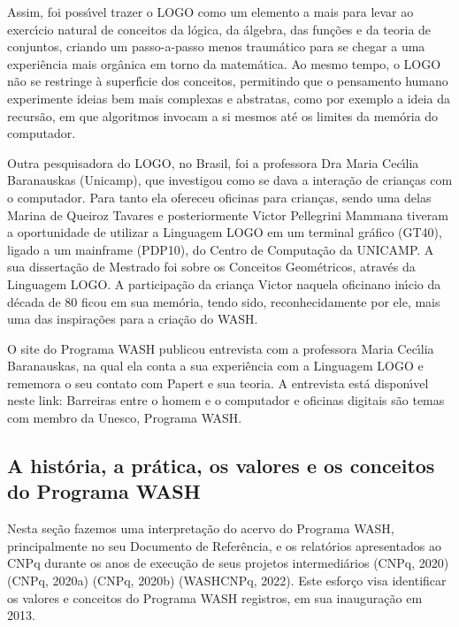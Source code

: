 \documentclass[
12pt,		%
openright,	%
twoside,  %
a4paper,			%
chapter=TITLE,		%
english,			%
french,				%
spanish,			%
brazil				%
]{USPSC-classe/USPSC}
\begin{document}
Assim, foi poss\'{\i}vel trazer o LOGO como um elemento a mais para levar ao exerc\'{\i}cio natural de conceitos da l\'ogica, da \'algebra, das fun\c{c}\~oes e da teoria de conjuntos, criando um passo-a-passo menos traum\'atico para se chegar a uma experi\^encia mais org\^anica em torno da matem\'atica. Ao mesmo tempo, o LOGO n\~ao se restringe \`a superf\'{\i}cie dos conceitos, permitindo que o pensamento humano experimente ideias bem mais complexas e abstratas, como por exemplo a ideia da recurs\~ao, em que algoritmos invocam a si mesmos at\'e os limites da mem\'oria do computador.








Outra pesquisadora do LOGO, no Brasil, foi a professora  Dra Maria Cec\'{\i}lia Baranauskas (Unicamp), que investigou como  se dava a intera\c{c}\~ao de crian\c{c}as com o computador. Para tanto ela ofereceu oficinas para  crian\c{c}as, sendo uma delas Marina de Queiroz Tavares  e posteriormente Victor Pellegrini Mammana  tiveram a oportunidade  de  utilizar a Linguagem LOGO em um terminal gr\'afico (GT40), ligado a um mainframe (PDP10), do Centro de Computa\c{c}\~ao da UNICAMP. A sua disserta\c{c}\~ao de Mestrado foi sobre os \textquotedbl Conceitos Geom\'etricos, atrav\'es da Linguagem LOGO\textquotedbl . A participa\c{c}\~ao da crian\c{c}a Victor naquela \textquotedbl oficina\textquotedbl  no in\'{\i}cio da d\'ecada de 80 ficou em sua mem\'oria, tendo sido, reconhecidamente por ele, mais uma das inspira\c{c}\~oes para a cria\c{c}\~ao do WASH.








O site do Programa WASH publicou entrevista com a professora Maria Cec\'{\i}lia Baranauskas, na qual ela conta a sua experi\^encia com a Linguagem LOGO e rememora o seu contato com Papert e sua teoria. A entrevista est\'a dispon\'{\i}vel neste link: \textquotedbl Barreiras entre o homem e o computador e oficinas digitais s\~ao temas com membro da Unesco, Programa WASH\textquotedbl .








\subsection[A hist\'oria, a pr\'atica, os valores e os conceitos do Programa WASH]{A hist\'oria, a pr\'atica, os valores e os conceitos do Programa WASH}\label{A hist\'oria, a pr\'atica, os valores e os conceitos do Programa WASH}
Nesta se\c{c}\~ao fazemos uma interpreta\c{c}\~ao do acervo do Programa WASH, principalmente no seu Documento de Refer\^encia, e os relat\'orios apresentados ao CNPq durante os anos de execu\c{c}\~ao de seus projetos intermedi\'arios  (CNPq, 2020)   (CNPq, 2020a)  (CNPq, 2020b)  (WASHCNPq, 2022). Este esfor\c{c}o visa identificar os valores e conceitos do Programa WASH registros, em sua inaugura\c{c}\~ao em 2013.
\end{document}
